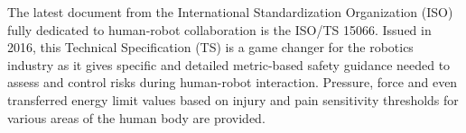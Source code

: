 The latest document from the International Standardization Organization (ISO) fully dedicated to human-robot collaboration is the ISO/TS 15066. Issued in 2016, this Technical Specification (TS) is a game changer for the robotics industry as it gives specific and detailed metric-based safety guidance needed to assess and control risks during human-robot interaction. Pressure, force and  even transferred energy limit values based on injury and pain sensitivity thresholds for various areas of the human body are provided. 



%
%
%
%
%
%
%
%
%
%

\\
\\

